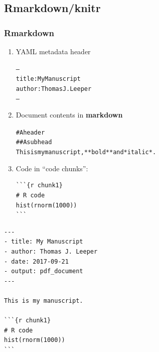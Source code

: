 \documentclass[14pt]{beamer}
\begin{document}
\frame{} 

\subsection{Rmarkdown/knitr}
\frame{\tableofcontents[currentsubsection]}


\begin{frame}[fragile]

\frametitle{Rmarkdown}

\begin{enumerate}\itemsep1em
\item YAML metadata header

\begin{alltt}\footnotesize
---
title: My Manuscript
author: Thomas J. Leeper
---
\end{alltt}


\item Document contents in \textbf{markdown}

\begin{alltt}\footnotesize
\# A header
\#\# A subhead
This is my manuscript, **bold** and *italic*.
\end{alltt}


\item Code in ``code chunks'':

\footnotesize
\begin{verbatim}
```{r chunk1}
# R code
hist(rnorm(1000))
```
\end{verbatim}
\end{enumerate}

\end{frame}


\begin{frame}[fragile]
\begin{verbatim}
---
- title: My Manuscript
- author: Thomas J. Leeper
- date: 2017-09-21
- output: pdf_document
---

This is my manuscript.

```{r chunk1}
# R code
hist(rnorm(1000))
```
\end{verbatim}
\end{frame}
\end{document}
